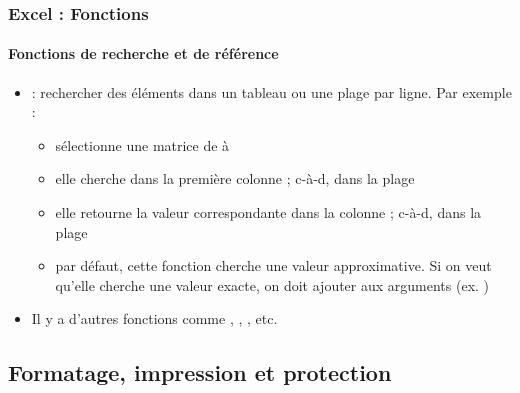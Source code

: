 \documentclass[xcolor=table, usenames,dvipsnames]{beamer}
\begin{document}
\begin{frame}
\frametitle{Excel : Fonctions}
\framesubtitle{Fonctions de recherche et de référence}

\begin{minipage}{0.69\textwidth}
	\begin{itemize}
		\item {} : rechercher des éléments dans un tableau ou une plage par ligne. Par exemple : 
		\begin{itemize}
			\item {} sélectionne une matrice de  à 
			\item elle cherche  dans la première  colonne ; c-à-d, dans la plage 
			\item elle retourne la valeur correspondante dans la colonne  ; c-à-d, dans la plage 
			\item par défaut, cette fonction cherche une valeur approximative. Si on veut qu'elle cherche une valeur exacte, on doit ajouter  aux arguments (ex. )
		\end{itemize} 
		\item Il y a d'autres fonctions comme , , , etc.
	\end{itemize}
\end{minipage}
%
\begin{minipage}{0.3\textwidth} 
	
\end{minipage}

\end{frame}

\subsection{Formatage, impression et protection}
\end{document}
